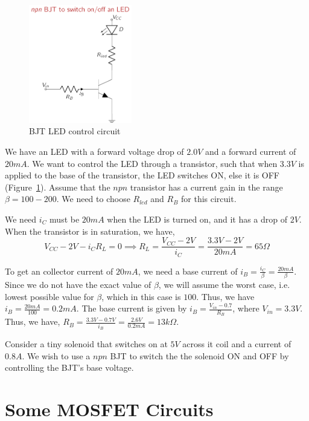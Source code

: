 \begin{figure}[htbp]
    \centering
    \includegraphics[width=0.4\textwidth]{figures/ch03/fig03-bjt-led.pdf}
    \caption{BJT LED control circuit}
    \label{fig:03-bjt-led}
\end{figure}
\begin{boxedstuff}
    \begin{example}
        We have an LED with a forward voltage drop of $2.0V$ and a forward current of $20mA$. We want to control the LED through a transistor, such that when $3.3V$ is applied to the base of the transistor, the LED switches ON, else it is OFF (Figure~\ref{fig:03-bjt-led}). Assume that the $npn$ transistor has a current gain in the range $\beta = 100-200$. We need to choose $R_{led}$ and $R_B$ for this circuit.

        We need $i_C$ must be $20mA$ when the LED is turned on, and it has a drop of $2V$. When the transistor is in saturation, we have,
        \[ V_{CC} - 2V - i_C R_L = 0 \implies R_L = \frac{V_{CC} - 2V}{i_C} = \frac{3.3V - 2V}{20mA} = 65\Omega \]

        To get an collector current of $20mA$, we need a base current of $i_B = \frac{i_C}{\beta} = \frac{20mA}{\beta}$. Since we do not have the exact value of $\beta$, we will assume the worst case, i.e. lowest possible value for $\beta$, which in this case is $100$. Thus, we have $i_B = \frac{20mA}{100} = 0.2mA$. The base current is given by $i_B = \frac{V_{in} - 0.7}{R_B}$, where $V_{in} = 3.3V$. Thus, we have, $R_B = \frac{3.3V - 0.7V}{i_B} = \frac{2.6V}{0.2mA} = 13k\Omega$.
    \end{example}
\end{boxedstuff}

\begin{boxedstuff}
    \begin{example}
        Consider a tiny solenoid that switches on at $5V$ across it coil and a current of $0.8A$. We wish to use  a $npn$ BJT to switch the the solenoid ON and OFF by controlling the BJT's base voltage. 
    \end{example}
\end{boxedstuff}

\section{Some MOSFET Circuits}



